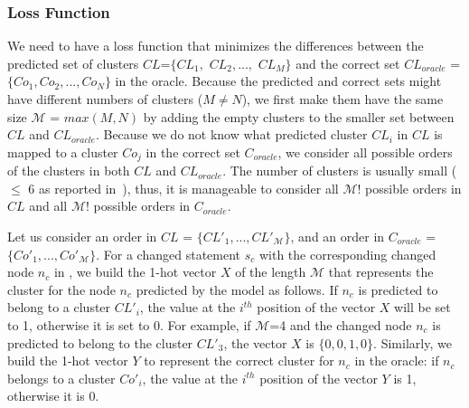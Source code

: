 
\subsubsection{Loss Function}

We need to have a loss function that minimizes the differences between
the predicted set of clusters $CL$=$\{CL_1,$ $CL_2, ...,$ $CL_M\}$ and
the correct set $CL_{oracle}$ = $\{Co_{1}, Co_{2},..., Co_{N}\}$ in
the oracle. Because the predicted and correct sets might have
different numbers of clusters ($M \neq N$), we first make them have
the same size $\mathcal{M}$ = $max(M,N)$ by adding the empty clusters
to the smaller set between $CL$ and $CL_{oracle}$.
%
Because we do not know what predicted cluster $CL_i$ in $CL$ is mapped
to a cluster $Co_j$ in the correct set $C_{oracle}$, we consider all
possible orders of the clusters in both $CL$ and $CL_{oracle}$.
The number of clusters is usually small ($\leq$ 6 as
reported in~\cite{nguyen-issre13}), thus, it is manageable to consider
all $\mathcal{M}!$ possible orders in $CL$ and all $\mathcal{M}!$
possible orders in $C_{oracle}$.

Let us consider an order in $CL$ = $\{CL'_1,..., CL'_{\mathcal{M}}\}$,
and an order in $C_{oracle}$ = $\{Co'_{1},..., Co'_{\mathcal{M}}\}$.
For a changed statement $s_c$ with the corresponding changed node
$n_c$ in {\mvpdg}, we build the 1-hot vector $X$ of the length
$\mathcal{M}$ that represents the cluster for the node $n_c$ predicted
by the model as follows. If $n_c$ is predicted to belong to a cluster
$CL'_{i}$, the value at the $i^{th}$ position of the vector $X$ will be set
to 1, otherwise it is set to 0. For example, if $\mathcal{M}$=4 and
the changed node $n_c$ is predicted to belong to the cluster $CL'_3$,
the vector $X$ is $\{0,0,1,0\}$.
Similarly, we build the 1-hot vector $Y$ to represent the correct
cluster for $n_c$ in the oracle: if $n_c$ belongs to a cluster
$Co'_{i}$, the value at the $i^{th}$ position of the vector $Y$ is 1,
otherwise it is 0.

